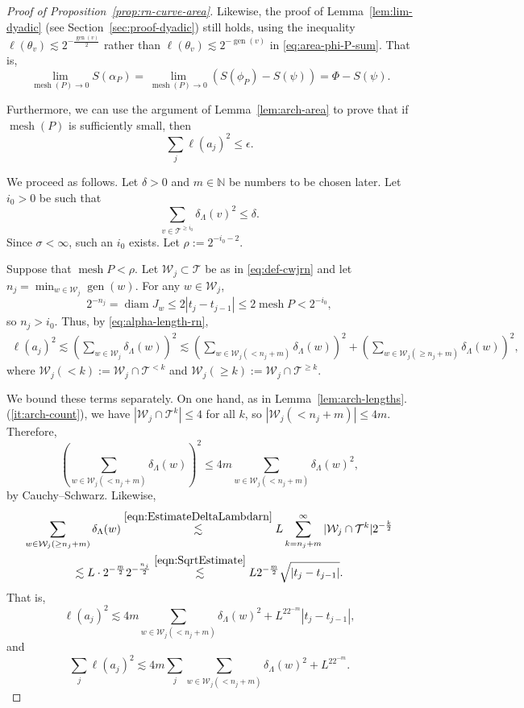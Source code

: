 \documentclass[10pt,a4paper]{amsart}
\newcommand{\cT}{\mathcal{T}}
\newcommand{\cW}{\mathcal{W}}
\DeclareMathOperator{\diam}{diam}
\DeclareMathOperator{\gen}{gen}
\DeclareMathOperator{\mesh}{mesh}
\begin{document}
\begin{proof}[Proof of Proposition~\ref{prop:rn-curve-area}]
  Likewise, the proof of Lemma~\ref{lem:lim-dyadic} (see Section~\ref{sec:proof-dyadic}) still holds, using the inequality $\ell(\theta_v)\lesssim 2^{-\frac{\gen(v)}{2}}$ rather than $\ell(\theta_v)\lesssim 2^{-\gen(v)}$ in \eqref{eq:area-phi-P-sum}. That is,
  \begin{equation}\label{eq:lim-dyadic-conclusion}
    \lim_{\mesh(P)\to 0} S(\alpha_P) = \lim_{\mesh(P)\to 0} (S(\phi_P) - S(\psi)) = \Phi - S(\psi).
  \end{equation}
  
  Furthermore, we can use the argument of Lemma~\ref{lem:arch-area} to prove that if $\mesh(P)$ is sufficiently small, then
  \begin{equation}\label{eqn:ajepsilon}
    \sum_j \ell(a_j)^2\leq \epsilon.
  \end{equation}

  We proceed as follows. Let $\delta > 0$ and $m\in \mathbb{N}$ be numbers to be chosen later. Let $i_0>0$ be such that
  $$
  \sum_{v\in \cT^{\ge i_0}}\delta_\Lambda(v)^2 \le \delta.
  $$
  Since $\sigma<\infty$, such an $i_0$ exists.
  Let $\rho:=2^{-i_0-2}$.

  Suppose that $\mesh P < \rho$.
  Let $\cW_j\subset \cT$ be as in \eqref{eq:def-cwjrn} and let $n_j = \min_{w\in \cW_j} \gen(w)$. For any $w\in \cW_j$,
  \begin{equation}\label{eqn:SqrtEstimate}
  2^{-n_j}=\diam J_w \leq 2|t_j-t_{j-1}|\leq 2\mesh P < 2^{-i_0},
  \end{equation}
  so $n_j > i_0$. Thus, by \eqref{eq:alpha-length-rn},
  \[
  \begin{aligned}
    \ell(a_j)^2 \lesssim \left(\sum_{w\in \cW_j} \delta_\Lambda(w)\right)^2  
    \lesssim \left(\sum_{w\in \cW_j(<n_j + m)}\delta_\Lambda(w)\right)^2 + \left(\sum_{w\in \cW_j(\ge n_j + m)}\delta_\Lambda(w)\right)^2,
\end{aligned}
  \]
  where $\cW_j(< k) := \cW_j\cap \cT^{< k}$ and $\cW_j(\ge k) := \cW_j\cap \cT^{\ge k}$.

  We bound these terms separately. On one hand, as in Lemma~\ref{lem:arch-lengths}.(\ref{it:arch-count}), we have $|\cW_j\cap\cT^k|\le 4$ for all $k$, so $|\cW_j(<n_j + m)| \le 4m$. Therefore,
  $$
  \left(\sum_{w\in \cW_j(<n_j + m)}\delta_\Lambda(w)\right)^2 \le 4m \sum_{w\in \cW_j(<n_j + m)}\delta_\Lambda(w)^2,
  $$
  by Cauchy--Schwarz. Likewise,
  \begin{multline*}
    \sum_{w\in \cW_j(\ge n_j + m)}\delta_\Lambda(w)
    \stackrel{\eqref{eqn:EstimateDeltaLambdarn}}{\lesssim} L \sum_{k=n_j+m}^\infty |\cW_j\cap\cT^k| 2^{-\frac{k}{2}} \\
    \lesssim L \cdot 2^{-\frac{m}{2}} 2^{-\frac{n_j}{2}} \stackrel{\eqref{eqn:SqrtEstimate}}{\lesssim} L2^{-\frac{m}{2}}\sqrt{|t_j-t_{j-1}|}.
  \end{multline*}
  That is,
  $$\ell(a_j)^2\lesssim 4m \sum_{w\in \cW_j(<n_j + m)}\delta_\Lambda(w)^2 + L^22^{-m} |t_j-t_{j-1}|,$$
  and
  $$\sum_j \ell(a_j)^2\lesssim 4m \sum_j \sum_{w\in \cW_j(<n_j + m)}\delta_\Lambda(w)^2 + L^22^{-m}.$$


\end{proof}
\end{document}
